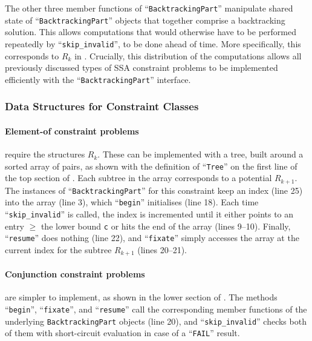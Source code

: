     The other three member functions of
    ``{\tt BacktrackingPart}'' manipulate shared state
    of ``{\tt BacktrackingPart}'' objects that together
    comprise a backtracking solution.
    This allows computations that would otherwise have to be performed
    repeatedly by ``{\tt skip\_invalid}'', to be done ahead of time.
    More specifically, this corresponds to $R_k$ in
    .
    Crucially, this distribution of the computations allows all previously
    discussed types of SSA constraint problems to be implemented efficiently
    with the ``{\tt BacktrackingPart}'' interface.

\subsubsection{Data Structures for Constraint Classes}

    \paragraph*{Element-of constraint problems} require the structures $R_k$.
    These can be implemented with a tree, built around a sorted array of pairs,
    as shown with the definition of ``{\tt Tree}'' on the first line of the
    top section of .
    Each subtree in the array corresponds to a potential $R_{k+1}$.
    The instances of ``{\tt BacktrackingPart}'' for this constraint keep an
    index (line 25) into the array (line 3), which ``{\tt begin}'' initialises
    (line 18).
    Each time ``{\tt skip\_invalid}'' is called, the index is incremented until
    it either points to an entry $\geq$ the lower bound {\tt c} or hits the
    end of the array (lines 9--10).
    Finally, ``{\tt resume}'' does nothing (line 22), and ``{\tt fixate}''
    simply accesses the array at the current index for the subtree $R_{k+1}$
    (lines 20--21).

    \paragraph*{Conjunction constraint problems} are simpler to implement, as
    shown in the lower section of .
    The methods ``{\tt begin}'', ``{\tt fixate}'', and ``{\tt resume}'' call the
    corresponding member functions of the underlying {\tt BacktrackingPart}
    objects (line 20), and ``{\tt skip\_invalid}'' checks both of them with
    short-circuit evaluation in case of a ``{\tt FAIL}'' result.

